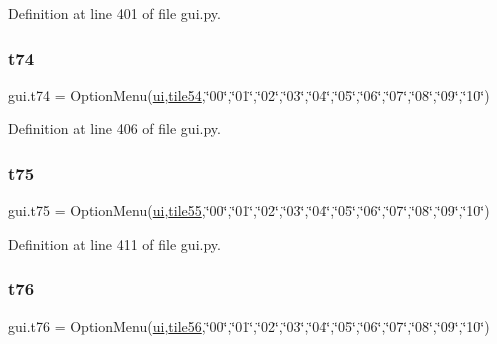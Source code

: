 Definition at line 401 of file gui.\+py.

\mbox{\label{namespacegui_af13d33015877269540a83b4fb4de14a8}} 
\subsubsection{\texorpdfstring{t74}{t74}}
{\footnotesize\ttfamily gui.\+t74 = Option\+Menu(\mbox{\hyperlink{namespacegui_a40ab7281456eadbea2dc2038f5c24fa1}{ui}},\mbox{\hyperlink{namespacegui_ac53f25e251f182149848acb4f70689ce}{tile54}},\char`\"{}00\char`\"{},\char`\"{}01\char`\"{},\char`\"{}02\char`\"{},\char`\"{}03\char`\"{},\char`\"{}04\char`\"{},\char`\"{}05\char`\"{},\char`\"{}06\char`\"{},\char`\"{}07\char`\"{},\char`\"{}08\char`\"{},\char`\"{}09\char`\"{},\char`\"{}10\char`\"{})}



Definition at line 406 of file gui.\+py.

\mbox{\label{namespacegui_a936b2507c77eb55b2f7f72de117e1f85}} 
\subsubsection{\texorpdfstring{t75}{t75}}
{\footnotesize\ttfamily gui.\+t75 = Option\+Menu(\mbox{\hyperlink{namespacegui_a40ab7281456eadbea2dc2038f5c24fa1}{ui}},\mbox{\hyperlink{namespacegui_ab5439a2d27d228c10b945525d2cd4ba1}{tile55}},\char`\"{}00\char`\"{},\char`\"{}01\char`\"{},\char`\"{}02\char`\"{},\char`\"{}03\char`\"{},\char`\"{}04\char`\"{},\char`\"{}05\char`\"{},\char`\"{}06\char`\"{},\char`\"{}07\char`\"{},\char`\"{}08\char`\"{},\char`\"{}09\char`\"{},\char`\"{}10\char`\"{})}



Definition at line 411 of file gui.\+py.

\mbox{\label{namespacegui_ac63fed841c323c5238ddbd64366953df}} 
\subsubsection{\texorpdfstring{t76}{t76}}
{\footnotesize\ttfamily gui.\+t76 = Option\+Menu(\mbox{\hyperlink{namespacegui_a40ab7281456eadbea2dc2038f5c24fa1}{ui}},\mbox{\hyperlink{namespacegui_ae2646c4dbcba62132b11bc430f3c5b45}{tile56}},\char`\"{}00\char`\"{},\char`\"{}01\char`\"{},\char`\"{}02\char`\"{},\char`\"{}03\char`\"{},\char`\"{}04\char`\"{},\char`\"{}05\char`\"{},\char`\"{}06\char`\"{},\char`\"{}07\char`\"{},\char`\"{}08\char`\"{},\char`\"{}09\char`\"{},\char`\"{}10\char`\"{})}



